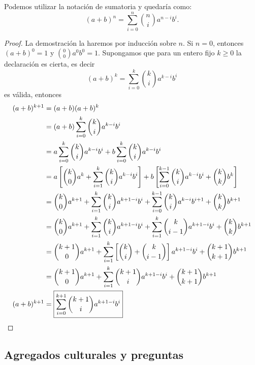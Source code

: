 Podemos utilizar la notación de sumatoria y quedaría como:
\[(a + b)^n = \sum\limits_{i = 0}^{n} \binom{n}{i}a^{n - i}b^i.\]

\begin{proof}
    La demostración la haremos por inducción sobre $n$.
    Si $n = 0$, entonces $(a + b)^0 = 1$ y $\binom{0}{0}a^0 b^0 = 1$.
    Supongamos que para un entero fijo $k \geq 0$ la declaración es cierta, es decir
    \[
        (a + b)^k = \sum\limits_{i = 0}^{k} \binom{k}{i}a^{k - i}b^i
    \]
    es válida, entonces
    \begin{align*}
        (a + b)^{k + 1} &= (a + b)(a + b)^k\\
        &= (a + b) \sum\limits_{i = 0}^{k} \binom{k}{i}a^{k - i}b^i\\
        &= a\sum\limits_{i = 0}^{k} \binom{k}{i}a^{k - i}b^i + b\sum\limits_{i = 0}^{k} \binom{k}{i}a^{k - i}b^i\\
        &= a\left[\binom{k}{0}a^{k} + \sum\limits_{i = 1}^{k} \binom{k}{i}a^{k - i}b^i\right] + b\left[\sum\limits_{i = 0}^{k - 1} \binom{k}{i}a^{k - i}b^i + \binom{k}{k}b^k\right]\\
        &= \binom{k}{0}a^{k + 1} + \sum\limits_{i = 1}^{k} \binom{k}{i}a^{k + 1 - i}b^i+ \sum\limits_{i = 0}^{k - 1} \binom{k}{i}a^{k - i}b^{i + 1} + \binom{k}{k}b^{k + 1} \\
        &= \binom{k}{0}a^{k + 1} + \sum\limits_{i = 1}^{k} \binom{k}{i}a^{k + 1 - i}b^i+ \sum\limits_{i = 1}^{k} \binom{k}{i - 1}a^{k + 1 - i}b^{i} + \binom{k}{k}b^{k + 1} \\
        &= \binom{k + 1}{0}a^{k + 1} + \sum\limits_{i = 1}^{k} \left[ \binom{k}{i} + \binom{k}{i - 1}\right] a^{k + 1 - i}b^i + \binom{k + 1}{k + 1}b^{k + 1} \\
        &= \binom{k + 1}{0}a^{k + 1} + \sum\limits_{i = 1}^{k} \binom{k + 1}{i} a^{k + 1 - i}b^i + \binom{k + 1}{k + 1}b^{k + 1} \\
        (a + b)^{k + 1} &= \boxed{\sum\limits_{i = 0}^{k + 1} \binom{k + 1}{i} a^{k + 1 - i}b^i} \qedhere
    \end{align*}
\end{proof}



\subsection{Agregados culturales y preguntas}

